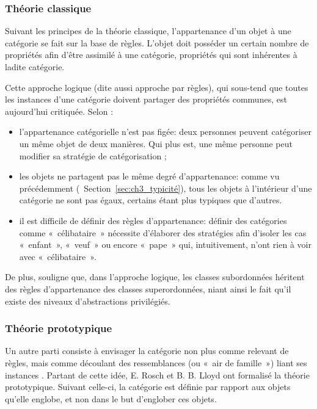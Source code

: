 \subsubsection{Théorie classique}

Suivant les principes de la théorie classique, l'appartenance d'un objet à une catégorie se fait sur la base de règles. L'objet doit posséder un certain nombre de propriétés afin d'être assimilé à une catégorie, propriétés qui sont inhérentes à ladite catégorie.

Cette approche logique (dite aussi approche par règles), qui sous-tend que toutes les instances d'une catégorie doivent partager des propriétés communes, est aujourd'hui critiquée. Selon \citep{goldstone2003concepts}:

\begin{itemize}
\item l'appartenance catégorielle n'est pas figée: deux personnes peuvent catégoriser un même objet de deux manières. Qui plus est, une même personne peut modifier sa stratégie de catégorisation \citep{mccloskey1978natural};
\item les objets ne partagent pas le même degré d'appartenance: comme vu précédemment (\cf~Section~\ref{sec:ch3_typicité}), tous les objets à l'intérieur d'une catégorie ne sont pas égaux, certains étant plus typiques que d'autres.
\item il est difficile de définir des règles d'appartenance: définir des catégories comme «~célibataire~» nécessite d'élaborer des stratégies afin d'isoler les cas «~enfant~», «~veuf~» ou encore «~pape~» qui, intuitivement, n'ont rien à voir avec «~célibataire~». 
\end{itemize}

De plus, \citep[49]{Houix03f} souligne que, dans l'approche logique, les classes subordonnées héritent des règles d'appartenance des classes superordonnées, niant ainsi le fait qu'il existe des niveaux d'abstractions privilégiés. 

\subsubsection{Théorie prototypique}

Un autre parti consiste à envisager la catégorie non plus comme relevant de règles, mais comme découlant des ressemblances (ou «~air de famille~») liant ses instances \citep{ludwig1953philosophical}. Partant de cette idée, E. Rosch et B. B. Lloyd \citep{rosch1978cognition} ont formalisé la théorie prototypique. Suivant celle-ci, la catégorie est définie par rapport aux objets qu'elle englobe, et non dans le but d'englober ces objets.

